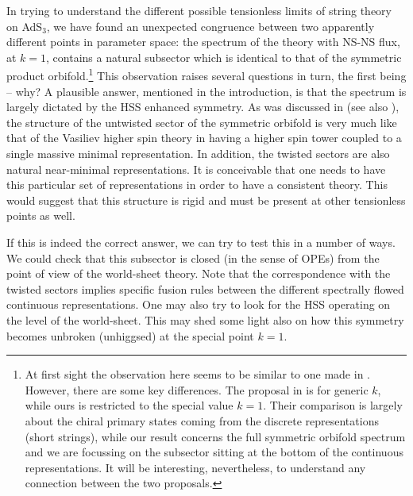\documentclass[12pt,a4paper]{article}
\begin{document}
In trying to understand the different possible tensionless limits of string theory on AdS$_3$, we have found an unexpected congruence between two apparently different points in parameter space: the spectrum of the theory with NS-NS flux, at $k=1$, contains a natural subsector which is identical to that of the symmetric product orbifold.\footnote{At first sight the observation here seems to be similar to one made in \cite{Argurio:2000tb}. However, there are some key differences. The proposal in \cite{Argurio:2000tb} is for generic $k$, while ours is restricted to the special value $k=1$. Their comparison is largely about the chiral primary states  coming from the discrete representations (short strings), while our result concerns the full symmetric orbifold spectrum and we are focussing on the subsector sitting at the bottom of the continuous representations. It will be interesting, nevertheless, to understand any connection between the two proposals.} This observation raises several questions in turn, the first being -- why? A plausible answer, mentioned in the introduction, is that the spectrum is largely dictated by the HSS enhanced symmetry. As was discussed in \cite{Gaberdiel:2015wpo} (see also \cite{Raeymaekers:2016mmm, Sharma:2017zjf}), the structure of the untwisted sector of the symmetric orbifold is very much like that of the Vasiliev higher spin theory in having a higher spin tower coupled to a single massive minimal representation. In addition, the twisted sectors are also natural  near-minimal representations. It is conceivable that one needs to have this particular set of representations in order to have a consistent theory. This would suggest that this structure is rigid and must be present at other tensionless points as well. 

If this is indeed the correct answer, we can try to test this in a number of ways. We could check that this subsector is closed (in the sense of OPEs) from the point of view of the world-sheet theory. Note that the correspondence with the twisted sectors implies specific fusion rules between the different spectrally flowed continuous representations. 
One may also try to look for the HSS operating on the level of the world-sheet. This may shed some light also on how this symmetry becomes unbroken (unhiggsed) at the special point $k=1$. 
\end{document}
